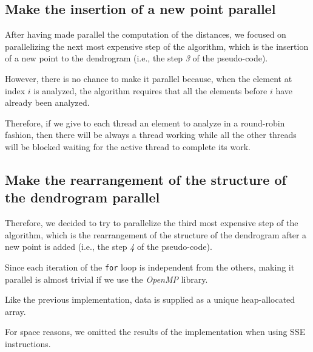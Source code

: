 \documentclass{article}
\begin{document}
\hypertarget{stage-3-parallel}{
\subsection{Make the insertion of a new point parallel}
\label{stage-3-parallel}}

After having made parallel the computation of the distances, we focused on parallelizing the
next most expensive step of the algorithm, which is the insertion of a new point to
the dendrogram (i.e., the step \textit{3} of the pseudo-code).

However, there is no chance to make it parallel because, when the element at index $i$ is
analyzed, the algorithm requires that all the elements before $i$ have already been analyzed.

Therefore, if we give to each thread an element to analyze in a round-robin fashion, then there will
be always a thread working while all the other threads will be blocked waiting for the active
thread to complete its work.

\hypertarget{stage-4-parallel}{
\subsection{Make the rearrangement of the structure of the dendrogram parallel}
\label{stage-4-parallel}}

Therefore, we decided to try to parallelize the third most expensive step of the algorithm, which
is the rearrangement of the structure of the
dendrogram after a new point is added (i.e., the step \textit{4} of the pseudo-code).

Since each iteration of the \texttt{for} loop is independent from the others, making it parallel
is almost trivial if we use the \emph{OpenMP} library.

Like the previous implementation, data is supplied as a unique heap-allocated array.

For space reasons, we omitted the results of the implementation when using SSE instructions.
\end{document}
